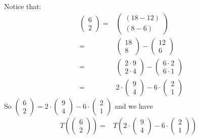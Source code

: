 \documentclass[12pt]{article}
\newenvironment{problem}[2][Problem]
{
	\begin{trivlist} 
		\item[\hskip \labelsep {\bfseries #1 #2:}]
	}
{
	\end{trivlist}
	}
\newenvironment{solution}[1][Solution]
{
	\begin{trivlist} 
		\item[\hskip \labelsep {\itshape #1:}]
	}
	{
	\end{trivlist}
}
\begin{document}
\begin{problem}{1}
\begin{solution}
Notice that:
\begin{align*}
\begin{pmatrix}6\\2\end{pmatrix}=&\begin{pmatrix}(18-12)\\(8-6)\end{pmatrix}\\
=& \begin{pmatrix}18\\8\end{pmatrix} - \begin{pmatrix}12\\6\end{pmatrix}\\
=& \begin{pmatrix}2\cdot 9\\2\cdot 4\end{pmatrix} - \begin{pmatrix}6 \cdot 2\\6 \cdot 1\end{pmatrix}\\
=& 2\cdot \begin{pmatrix}9\\4\end{pmatrix} - 6 \cdot \begin{pmatrix}2\\1\end{pmatrix}
\end{align*}
So $\begin{pmatrix}6\\2\end{pmatrix}=2\cdot \begin{pmatrix}9\\4\end{pmatrix} - 6 \cdot \begin{pmatrix}2\\1\end{pmatrix}$ and we have
\begin{align*}
T\left(\begin{pmatrix}6\\2\end{pmatrix}\right) =&T\left(2\cdot \begin{pmatrix}9\\4\end{pmatrix} - 6 \cdot \begin{pmatrix}2\\1\end{pmatrix}\right) &\\

\end{align*}
\end{solution}
\end{problem}
\end{document}
